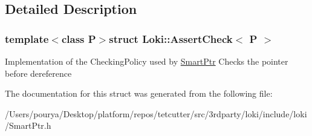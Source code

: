 \subsection{Detailed Description}
\subsubsection*{template$<$class P$>$struct Loki\+::\+Assert\+Check$<$ P $>$}

Implementation of the Checking\+Policy used by \hyperlink{classLoki_1_1SmartPtr}{Smart\+Ptr} Checks the pointer before dereference 

The documentation for this struct was generated from the following file\+:\begin{DoxyCompactItemize}
\item 
/\+Users/pourya/\+Desktop/platform/repos/tetcutter/src/3rdparty/loki/include/loki/Smart\+Ptr.\+h\end{DoxyCompactItemize}
